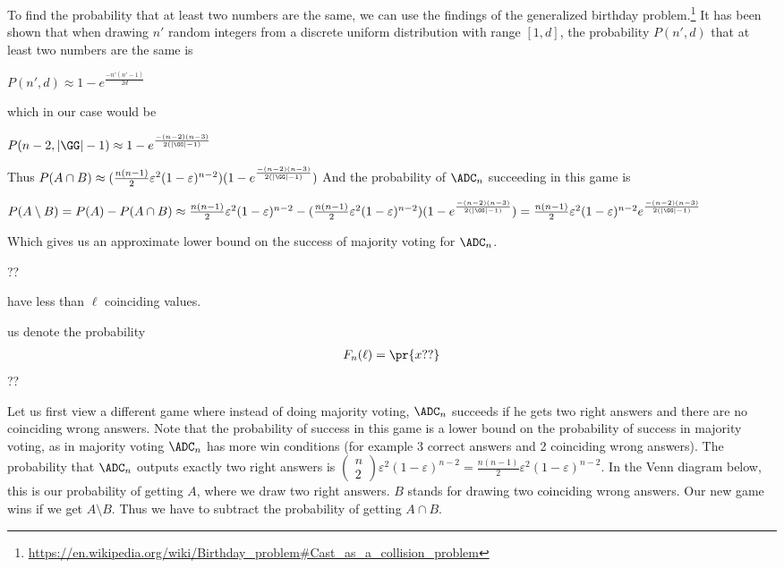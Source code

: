 \documentclass{crypto-exercise}
\begin{document}
\begin{solution}
To find the probability that at least two numbers are the same, we can use the findings of the generalized birthday problem.\footnote{\url{https://en.wikipedia.org/wiki/Birthday_problem\#Cast_as_a_collision_problem}} It has been shown that when drawing $n'$ random integers from a discrete uniform distribution with range $[1,d]$, the probability $P(n',d)$ that at least two numbers are the same is
\begin{center}
$P(n',d) \approx 1 - e^{\frac{-n'(n'-1)}{2d}}$
\end{center}
which in our case would be
\begin{center}
$P(n-2,|\GG|-1) \approx 1 - e^{\frac{-(n-2)(n-3)}{2(|\GG|-1)}}$
\end{center}
Thus $P(A \cap B) \approx (\frac{n(n-1)}{2} \varepsilon^2 (1-\varepsilon)^{n-2})  (1 - e^{\frac{-(n-2)(n-3)}{2(|\GG|-1)}})$
And the probability of $\ADC_n$ succeeding in this game is
\begin{center}
$P(A \setminus B) = P(A) - P(A \cap B) \approx \frac{n(n-1)}{2} \varepsilon^2 (1-\varepsilon)^{n-2} - (\frac{n(n-1)}{2} \varepsilon^2 (1-\varepsilon)^{n-2})  (1 - e^{\frac{-(n-2)(n-3)}{2(|\GG|-1)}}) = \frac{n(n-1)}{2} \varepsilon^2 (1-\varepsilon)^{n-2}e^{\frac{-(n-2)(n-3)}{2(|\GG|-1)}}$
\end{center}
Which gives us an approximate lower bound on the success of majority voting for $\ADC_n$. 

??

have less than $\ell$ coinciding values. 

us denote the probability  
\begin{align*}
F_{n}(\ell)=\pr{x??}
\end{align*} 
??

Let us first view a different game where instead of doing majority voting, $\ADC_n$ succeeds if he gets two right answers and there are no coinciding wrong answers. Note that the probability of success in this game is a lower bound on the probability of success in majority voting, as in majority voting $\ADC_n$ has more win conditions (for example 3 correct answers and 2 coinciding wrong answers). The probability that $\ADC_n$ outputs exactly two right answers is $\begin{pmatrix}
n \\
2
\end{pmatrix} \varepsilon^2 (1-\varepsilon)^{n-2} = \frac{n(n-1)}{2}\varepsilon^2 (1-\varepsilon)^{n-2} $. In the Venn diagram below, this is our probability of getting $A$, where we draw two right answers. $B$ stands for drawing two coinciding wrong answers. Our new game wins if we get $A \setminus B$. Thus we have to subtract the probability of getting $A \cap B$.



\end{solution}
\end{document}
